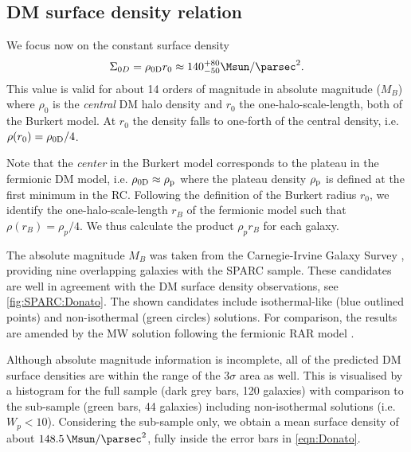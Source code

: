 \subsection{DM surface density relation}
\label{sec:dark-matter-surface-density}

We focus now on the constant surface density \citep{2009MNRAS.397.1169D} 
%
\begin{equation}
\label{eqn:Donato}
	\Sigma_{0D} = \rho_{\rm 0D} r_0 \approx 140_{-50}^{+80} \si{\Msun\per\parsec^2}.
\end{equation} 
%
This value is valid for about 14 orders of magnitude in absolute magnitude ($M_B$) where $\rho_0$ is the \textit{central} DM halo density and $r_0$ the one-halo-scale-length, both of the Burkert model. At $r_0$ the density falls to one-forth of the central density, i.e. $\rho(r_0) = \rho_{\rm 0D}/4$.

Note that the \textit{center} in the Burkert model corresponds to the plateau in the fermionic DM model, i.e. $\rho_{\rm 0D} \approx \rho_{\rm p}$ where the plateau density $\rho_{\rm p}$ is defined at the first minimum in the RC. Following the definition of the Burkert radius $r_0$, we identify the one-halo-scale-length $r_B$ of the fermionic model such that $\rho(r_B) = \rho_p/4$. We thus calculate the product $\rho_p r_B$ for each galaxy.

The absolute magnitude $M_B$ was taken from the Carnegie-Irvine Galaxy Survey \citep{2011ApJS..197...21H}, providing nine overlapping galaxies with the SPARC sample. These candidates are well in agreement with the DM surface density observations, see \cref{fig:SPARC:Donato}. The shown candidates include isothermal-like (blue outlined points) and non-isothermal (green circles) solutions. For comparison, the results are amended by the MW solution following the fermionic RAR model \citep{2018PDU....21...82A}.


Although absolute magnitude information is incomplete, all of the predicted DM surface densities are within the range of the $3\sigma$ area as well. This is visualised by a histogram for the full sample (dark grey bars, 120 galaxies) with comparison to the sub-sample (green bars, 44 galaxies) including non-isothermal solutions (i.e. $W_p < 10$). Considering the sub-sample only, we obtain a mean surface density of about $\SI{148.5}{\Msun/\parsec^2}$, fully inside the error bars in \cref{eqn:Donato}.

